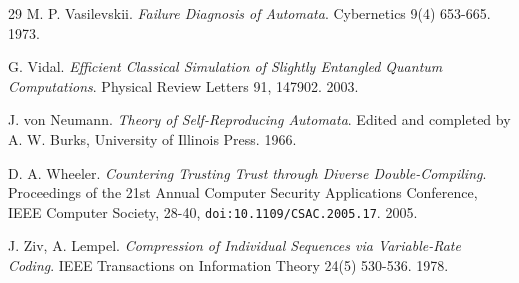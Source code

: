 \begin{thebibliography}{29}
M. P. Vasilevskii. \emph{Failure Diagnosis of Automata}. Cybernetics 9(4) 653-665. 1973.

G. Vidal. \emph{Efficient Classical Simulation of Slightly Entangled Quantum Computations}. Physical Review Letters 91, 147902. 2003.

J. von Neumann. \emph{Theory of Self-Reproducing Automata}. Edited and completed by A. W. Burks, University of Illinois Press. 1966.

D. A. Wheeler. \emph{Countering Trusting Trust through Diverse Double-Compiling}. Proceedings of the 21st Annual Computer Security Applications Conference, IEEE Computer Society, 28-40, \texttt{doi:10.1109/\allowbreak{}CSAC.2005.17}. 2005.

J. Ziv, A. Lempel. \emph{Compression of Individual Sequences via Variable-Rate Coding}. IEEE Transactions on Information Theory 24(5) 530-536. 1978.

\end{thebibliography}
